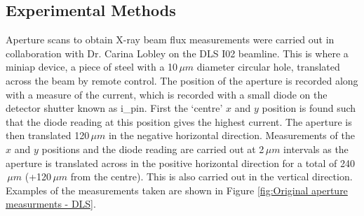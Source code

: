 \subsection{Experimental Methods}
\label{sub:Experimental Methods - DLS}
Aperture scans to obtain X-ray beam flux measurements were carried out in collaboration with Dr. Carina Lobley on the DLS I02 beamline.
This is where a miniap device, a piece of steel with a 10$\,\mu m$ diameter circular hole, translated across the beam by remote control.
The position of the aperture is recorded along with a measure of the current, which is recorded with a small diode on the detector shutter known as i\_pin.
\newline
First the `centre' $x$ and $y$ position is found such that the diode reading at this position gives the highest current.
The aperture is then translated 120$\,\mu m$ in the negative horizontal direction.
Measurements of the $x$ and $y$ positions and the diode reading are carried out at 2$\,\mu m$ intervals as the aperture is translated across in the positive horizontal direction for a total of 240$\,\mu m$ (+120$\,\mu m$ from the centre).
This is also carried out in the vertical direction.
Examples of the measurements taken are shown in Figure \ref{fig:Original aperture measurments - DLS}.
